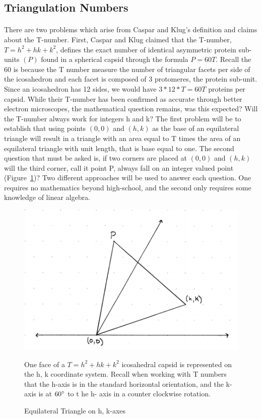 \documentclass[12pt,letter]{article}
\begin{document}
\subsection{Triangulation Numbers} %
\paragraph{}
There are two problems which arise from Caspar and Klug's definition and claims about the T-number. First, Caspar and Klug claimed that the T-number, $T = h^2 + hk + k^2$, defines the exact number of identical asymmetric protein sub-units $(P)$ found in a spherical capsid through the formula $P = 60T$. Recall the 60 is because the T number measure the number of triangular facets per side of the icosahedron and each facet is composed of 3 protomeres, the protein sub-unit. Since an icosahedron has 12 sides, we would have $3*12*T = 60T$ proteins per capsid. While their T-number has been confirmed as accurate through better electron microscopes, the mathematical question remains, was this expected? Will the T-number always work for integers h and k? The first problem will be to establish that using points $(0,0)$ and $(h,k)$ as the base of an equilateral triangle will result in a triangle with an area equal to T times the area of an equilateral triangle with unit length, that is base equal to one. The second question that must be asked is, if two corners are placed at $(0,0)$ and $(h,k)$ will the third corner, call it point P, always fall on an integer valued point (Figure~\ref{fig:setup})? Two different approaches will be used to answer each question. One requires no mathematics beyond high-school, and the second only requires some knowledge of linear algebra.

\begin{figure}[h]
	\caption{Equilateral Triangle on h, k-axes}
	\centering
	\includegraphics[width=.7\textwidth]{ddagger0_tri_setup.pdf}
	\begin{minipage}[h]{.9\textwidth}
		\begin{footnotesize}
		One face of a $T=h^2 + hk + k^2$ icosahedral capsid is represented on the h, k coordinate system. Recall when 		working with T numbers that the h-axis is in the standard horizontal orientation, and the k-axis is at $60 \degree$ to t		he h-	axis in a counter clockwise rotation.
		\end{footnotesize}
	\end{minipage}
	\label{fig:setup}
\end{figure}
\end{document}
